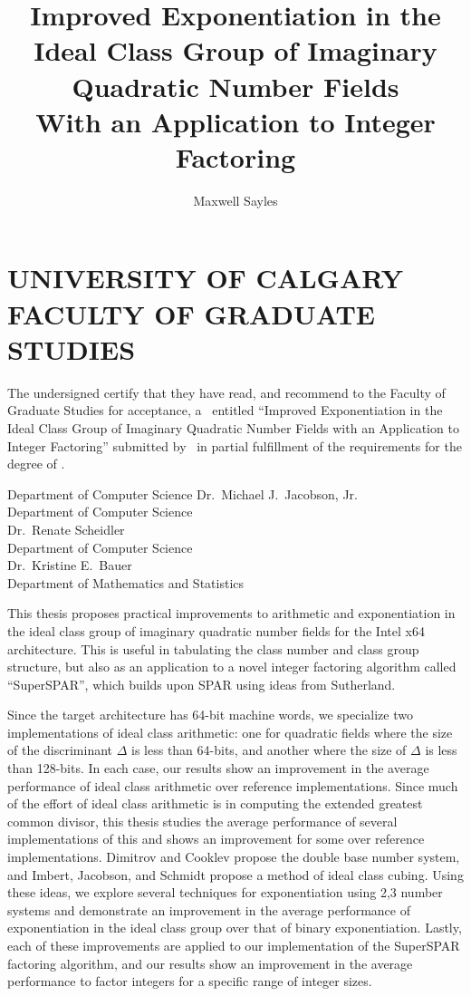 \documentclass{ucalgthes1}
\title{Improved Exponentiation in the Ideal Class Group of Imaginary Quadratic Number Fields \\ \bigskip With an Application to Integer Factoring}
\author{Maxwell Sayles}
\newcommand{\thesistitle}{Improved Exponentiation in the Ideal Class Group of Imaginary Quadratic Number Fields with an Application to Integer Factoring}
\theoremstyle{definition}
\begin{document}
\makethesistitle
{}     %
\setcounter{page}{1}
\chapter*{UNIVERSITY OF CALGARY \\ FACULTY OF GRADUATE STUDIES}
\thispagestyle{empty}
The undersigned certify that they have read, and recommend
to the Faculty of Graduate Studies for acceptance, a \Thesis\ entitled
``\thesistitle'' submitted by \Author\
in partial fulfillment of the requirements for the degree of
\Degree.\\

%

\begin{signing}{Department of Computer Science}
\signline
Dr.~Michael J.~Jacobson, Jr. \\
Department of Computer Science \\
\signline
Dr.~Renate Scheidler \\
Department of Computer Science \\
\signline
Dr.~Kristine E.~Bauer \\
Department of Mathematics and Statistics \\
\end{signing}

\newpage
{}
{}

This thesis proposes practical improvements to arithmetic and exponentiation in the ideal class group of imaginary quadratic number fields for the Intel x64 architecture.  This is useful in tabulating the class number and class group structure, but also as an application to a novel integer factoring algorithm called ``SuperSPAR'', which builds upon SPAR using ideas from Sutherland.

Since the target architecture has 64-bit machine words, we specialize two implementations of ideal class arithmetic: one for quadratic fields where the size of the discriminant $\Delta$ is less than 64-bits, and another where the size of $\Delta$ is less than 128-bits.  In each case, our results show an improvement in the average performance of ideal class arithmetic over reference implementations.  Since much of the effort of ideal class arithmetic is in computing the extended greatest common divisor, this thesis studies the average performance of several implementations of this and shows an improvement for some over reference implementations.  Dimitrov and Cooklev propose the double base number system, and Imbert, Jacobson, and Schmidt propose a method of ideal class cubing.  Using these ideas, we explore several techniques for exponentiation using 2,3 number systems and demonstrate an improvement in the average performance of exponentiation in the ideal class group over that of binary exponentiation.  Lastly, each of these improvements are applied to our implementation of the SuperSPAR factoring algorithm, and our results show an improvement in the average performance to factor integers for a specific range of integer sizes.
\end{document}

